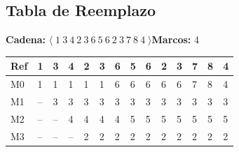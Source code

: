 \documentclass[12pt,a4paper]{article}
\begin{document}
\subsection{Tabla de Reemplazo}
\textbf{Cadena:} $\langle\;1\ 3\ 4\ 2\ 3\ 6\ 5\ 6\ 2\ 3\ 7\ 8\ 4\;\rangle$\quad\textbf{Marcos:} 4
\medskip
\begin{center}
\scriptsize\setlength{\tabcolsep}{2pt}
\begin{tabular}{|l|>{\centering\arraybackslash}p{0.4cm}|>{\centering\arraybackslash}p{0.4cm}|>{\centering\arraybackslash}p{0.4cm}|>{\centering\arraybackslash}p{0.4cm}|>{\centering\arraybackslash}p{0.4cm}|>{\centering\arraybackslash}p{0.4cm}|>{\centering\arraybackslash}p{0.4cm}|>{\centering\arraybackslash}p{0.4cm}|>{\centering\arraybackslash}p{0.4cm}|>{\centering\arraybackslash}p{0.4cm}|>{\centering\arraybackslash}p{0.4cm}|>{\centering\arraybackslash}p{0.4cm}|>{\centering\arraybackslash}p{0.4cm}|}
\hline
\textbf{Ref} & \cellcolor{faultcol!50}\textbf{1} & \cellcolor{faultcol!50}\textbf{3} & \cellcolor{faultcol!50}\textbf{4} & \cellcolor{faultcol!50}\textbf{2} & \cellcolor{hitcol!40}\textbf{3} & \cellcolor{faultcol!50}\textbf{6} & \cellcolor{faultcol!50}\textbf{5} & \cellcolor{hitcol!40}\textbf{6} & \cellcolor{hitcol!40}\textbf{2} & \cellcolor{hitcol!40}\textbf{3} & \cellcolor{faultcol!50}\textbf{7} & \cellcolor{faultcol!50}\textbf{8} & \cellcolor{faultcol!50}\textbf{4} \\
\hline
M0 & \cellcolor{pB!40}1 & \cellcolor{pB!40}1 & \cellcolor{pB!40}1 & \cellcolor{pB!40}1 & \cellcolor{pB!40}1 & \cellcolor{pG!40}6 & \cellcolor{pG!40}6 & \cellcolor{pG!40}6 & \cellcolor{pG!40}6 & \cellcolor{pG!40}6 & \cellcolor{pH!40}7 & \cellcolor{pI!40}8 & \cellcolor{pE!40}4 \\
M1 & {\color{gray!60}--} & \cellcolor{pD!40}3 & \cellcolor{pD!40}3 & \cellcolor{pD!40}3 & \cellcolor{pD!40}3 & \cellcolor{pD!40}3 & \cellcolor{pD!40}3 & \cellcolor{pD!40}3 & \cellcolor{pD!40}3 & \cellcolor{pD!40}3 & \cellcolor{pD!40}3 & \cellcolor{pD!40}3 & \cellcolor{pD!40}3 \\
M2 & {\color{gray!60}--} & {\color{gray!60}--} & \cellcolor{pE!40}4 & \cellcolor{pE!40}4 & \cellcolor{pE!40}4 & \cellcolor{pE!40}4 & \cellcolor{pF!40}5 & \cellcolor{pF!40}5 & \cellcolor{pF!40}5 & \cellcolor{pF!40}5 & \cellcolor{pF!40}5 & \cellcolor{pF!40}5 & \cellcolor{pF!40}5 \\
M3 & {\color{gray!60}--} & {\color{gray!60}--} & {\color{gray!60}--} & \cellcolor{pC!40}2 & \cellcolor{pC!40}2 & \cellcolor{pC!40}2 & \cellcolor{pC!40}2 & \cellcolor{pC!40}2 & \cellcolor{pC!40}2 & \cellcolor{pC!40}2 & \cellcolor{pC!40}2 & \cellcolor{pC!40}2 & \cellcolor{pC!40}2 \\

\end{tabular}
\end{center}
\end{document}
